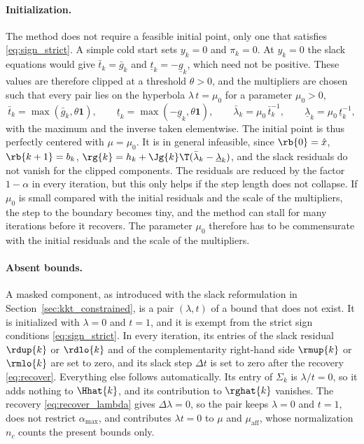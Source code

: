 \paragraph{Initialization.}
The method does not require a feasible initial point, only one that satisfies \eqref{eq:sign_strict}.
A simple cold start sets $y_k = 0$ and $\pi_k = 0$.
At $y_k = 0$ the slack equations would give $\bar{t}_k = \bar{g}_k$ and $\underline{t}_k = -\underline{g}_k$, which need not be positive.
These values are therefore clipped at a threshold $\theta > 0$, and the multipliers are chosen such that every pair lies on the hyperbola $\lambda\, t = \mu_0$ for a parameter $\mu_0 > 0$,
\[
    \bar{t}_k = \max(\bar{g}_k, \theta\mathbf{1}) , \qquad
    \underline{t}_k = \max(-\underline{g}_k, \theta\mathbf{1}) , \qquad
    \bar{\lambda}_k = \mu_0\, \bar{t}_k^{-1} , \qquad
    \underline{\lambda}_k = \mu_0\, \underline{t}_k^{-1} ,
\]
with the maximum and the inverse taken elementwise.
The initial point is thus perfectly centered with $\mu = \mu_0$.
It is in general infeasible, since $\rb{0} = \hat{x}$, $\rb{k+1} = b_k$, $\rg{k} = h_k + \Jg{k}\T(\bar{\lambda}_k - \underline{\lambda}_k)$, and the slack residuals do not vanish for the clipped components.
The residuals are reduced by the factor $1 - \alpha$ in every iteration, but this only helps if the step length does not collapse.
If $\mu_0$ is small compared with the initial residuals and the scale of the multipliers, the step to the boundary becomes tiny, and the method can stall for many iterations before it recovers.
The parameter $\mu_0$ therefore has to be commensurate with the initial residuals and the scale of the multipliers.

\paragraph{Absent bounds.}
A masked component, as introduced with the slack reformulation in Section~\ref{sec:kkt_constrained}, is a pair $(\lambda, t)$ of a bound that does not exist.
It is initialized with $\lambda = 0$ and $t = 1$, and it is exempt from the strict sign conditions \eqref{eq:sign_strict}.
In every iteration, its entries of the slack residual $\rdup{k}$ or $\rdlo{k}$ and of the complementarity right-hand side $\rmup{k}$ or $\rmlo{k}$ are set to zero, and its slack step $\Delta t$ is set to zero after the recovery \eqref{eq:recover}.
Everything else follows automatically.
Its entry of $\Sigma_k$ is $\lambda / t = 0$, so it adds nothing to $\Hhat{k}$, and its contribution to $\rghat{k}$ vanishes.
The recovery \eqref{eq:recover_lambda} gives $\Delta\lambda = 0$, so the pair keeps $\lambda = 0$ and $t = 1$, does not restrict $\alpha_{\max}$, and contributes $\lambda t = 0$ to $\mu$ and $\mu_{\text{aff}}$, whose normalization $n_c$ counts the present bounds only.

